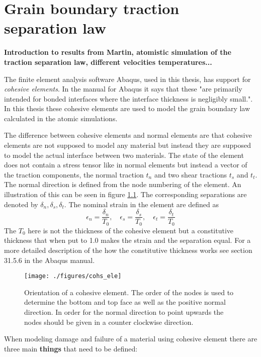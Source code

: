 \documentclass[generate_interface_elements.tex]{subfiles}
\begin{document}
\chapter{Grain boundary traction separation law}

\textbf{Introduction to results from Martin, atomistic simulation of the traction separation law, different velocities temperatures...}



The finite element analysis software Abaqus, used in this thesis, has support for \textit{cohesive elements}. In the manual for Abaqus it says that these "are primarily intended for bonded interfaces where the interface thickness is negligibly small.". In this thesis these cohesive elements are used to model the grain boundary law calculated in the atomic simulations.

The difference between cohesive elements and normal elements are that cohesive elements are not supposed to model any material but instead they are supposed to model the actual interface between two materials. The state of the element does not contain a stress tensor like in normal elements but instead a vector of the traction components, the normal traction $t_n$ and two shear tractions $t_s$ and $t_t$. The normal direction is defined from the node numbering of the element. An illustration of this can be seen in figure \ref{fig:cohs_ori}. The corresponding separations are denoted by $\delta_n, \delta_s, \delta_t$. The nominal strain in the element are defined as
%
\[ \epsilon_n = \frac{\delta_n}{T_0}, \quad \epsilon_s = \frac{\delta_s}{T_0}, \quad \epsilon_t = \frac{\delta_t}{T_0}  \]
%
The $T_0$ here is not the thickness of the cohesive element but a constitutive thickness that when put to 1.0 makes the strain and the separation equal. For a more detailed description of the how the constitutive thickness works see section 31.5.6 in the Abaqus manual.




\begin{figure}
\centering
 \texttt{[image: ./figures/cohs\_ele]}
\caption{Orientation of a cohesive element. The order of the nodes is used to determine the bottom and top face as well as the positive normal direction. In order for the normal direction to point upwards the nodes should be given in a counter clockwise direction.}
\label{fig:cohs_ori}
\end{figure}


When modeling damage and failure of a material using cohesive element there are three main \textbf{things} that need to be defined:
\end{document}
